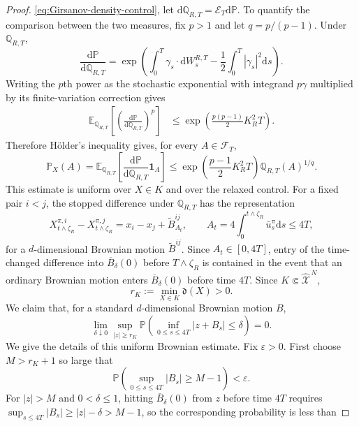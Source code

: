 \documentclass[11pt]{article}
\def\E{\mathbb{E}}
\def\P{\mathbb{P}}
\def\Q{\mathbb{Q}}
\def\Fc{{\mathcal F}}
\def\Xc{{\mathcal X}}
\def\id{\mathbf{1}}
\def\hX{\widehat{\Xc}^{\,N}}
\newcommand{\dd}{\mathrm{d}}
\theoremstyle{definition}
\theoremstyle{remark}
\numberwithin{equation}{section}
\begin{document}
\begin{proof}
\eqref{eq:Girsanov-density-control}, let $\dd\Q_{R,T}=\mathcal E_T\dd\P$.  To quantify the
comparison between the two measures, fix $p>1$ and let $q=p/(p-1)$.  Under $\Q_{R,T}$,
\[
 \frac{\dd\P}{\dd\Q_{R,T}}
 =\exp\left(\int_0^T\gamma_s\cdot\dd W_s^{R,T}
 -\frac12\int_0^T|\gamma_s|^2\dd s\right).
\]
Writing the $p$th power as the stochastic exponential with integrand $p\gamma$ multiplied by its
finite-variation correction gives
\begin{align}
 \E_{\Q_{R,T}}\left[
 \left(\frac{\dd\P}{\dd\Q_{R,T}}\right)^p\right]
 &\le\exp\left(\frac{p(p-1)}2K_R^2T\right).
 \label{eq:RN-p-moment-collision}
\end{align}
Therefore H\"older's inequality gives, for every $A\in\Fc_T$,
\begin{equation}\label{eq:girsanov-holder-collision}
 \P_X(A)
 =\E_{\Q_{R,T}}\left[
 \frac{\dd\P}{\dd\Q_{R,T}}\id_A\right]
 \le \exp\left(\frac{p-1}{2}K_R^2T\right)
 \Q_{R,T}(A)^{1/q}.
\end{equation}
This estimate is uniform over $X\in K$ and over the relaxed control.
For a fixed pair $i<j$, the stopped difference under $\Q_{R,T}$ has the representation
\begin{equation}\label{eq:pair-time-change-localization}
 X_{t\wedge\zeta_R}^{\pi,i}-X_{t\wedge\zeta_R}^{\pi,j}
 =x_i-x_j+\widetilde B^{ij}_{A_t},
 \qquad
 A_t=4\int_0^{t\wedge\zeta_R}\bar u_s^\pi\dd s\le4T,
\end{equation}
for a $d$-dimensional Brownian motion $\widetilde B^{ij}$.  Since $A_t\in[0,4T]$, entry of the
time-changed difference into $\overline B_\delta(0)$ before $T\wedge\zeta_R$ is contained in
the event that an ordinary Brownian motion enters $\overline B_\delta(0)$ before time $4T$.
Since $K\Subset\hX$,
\begin{equation}\label{eq:rK-control}
 r_K:=\min_{X\in K}\mathfrak d(X)>0.
\end{equation}
We claim that, for a standard $d$-dimensional Brownian motion $B$,
\begin{equation}\label{eq:brownian-small-ball-localization}
 \lim_{\delta\downarrow0}
 \sup_{|z|\ge r_K}
 \P\left(\inf_{0\le s\le4T}|z+B_s|\le\delta\right)=0.
\end{equation}
We give the details of this uniform Brownian estimate.  Fix $\varepsilon>0$.  First choose
$M>r_K+1$ so large that
\[
 \P\left(\sup_{0\le s\le4T}|B_s|\ge M-1\right)<\varepsilon.
\]
For $|z|>M$ and $0<\delta\le1$, hitting $\overline B_\delta(0)$ from $z$ before time $4T$ requires
$\sup_{s\le4T}|B_s|\ge|z|-\delta>M-1$, so the corresponding probability is less than

\end{proof}
\end{document}
